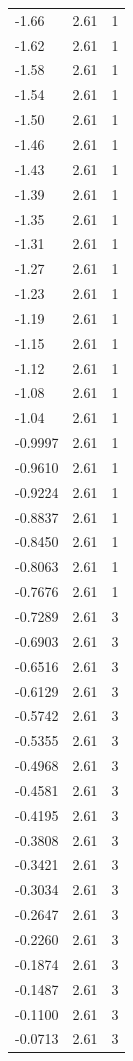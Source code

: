 \begin{longtable}{lrr}
  -1.66 & 2.61 & 1 \\
  -1.62 & 2.61 & 1 \\
  -1.58 & 2.61 & 1 \\
  -1.54 & 2.61 & 1 \\
  -1.50 & 2.61 & 1 \\
  -1.46 & 2.61 & 1 \\
  -1.43 & 2.61 & 1 \\
  -1.39 & 2.61 & 1 \\
  -1.35 & 2.61 & 1 \\
  -1.31 & 2.61 & 1 \\
  -1.27 & 2.61 & 1 \\
  -1.23 & 2.61 & 1 \\
  -1.19 & 2.61 & 1 \\
  -1.15 & 2.61 & 1 \\
  -1.12 & 2.61 & 1 \\
  -1.08 & 2.61 & 1 \\
  -1.04 & 2.61 & 1 \\
  -0.9997 & 2.61 & 1 \\
  -0.9610 & 2.61 & 1 \\
  -0.9224 & 2.61 & 1 \\
  -0.8837 & 2.61 & 1 \\
  -0.8450 & 2.61 & 1 \\
  -0.8063 & 2.61 & 1 \\
  -0.7676 & 2.61 & 1 \\
  -0.7289 & 2.61 & 3 \\
  -0.6903 & 2.61 & 3 \\
  -0.6516 & 2.61 & 3 \\
  -0.6129 & 2.61 & 3 \\
  -0.5742 & 2.61 & 3 \\
  -0.5355 & 2.61 & 3 \\
  -0.4968 & 2.61 & 3 \\
  -0.4581 & 2.61 & 3 \\
  -0.4195 & 2.61 & 3 \\
  -0.3808 & 2.61 & 3 \\
  -0.3421 & 2.61 & 3 \\
  -0.3034 & 2.61 & 3 \\
  -0.2647 & 2.61 & 3 \\
  -0.2260 & 2.61 & 3 \\
  -0.1874 & 2.61 & 3 \\
  -0.1487 & 2.61 & 3 \\
  -0.1100 & 2.61 & 3 \\
  -0.0713 & 2.61 & 3 \\

\end{longtable}
